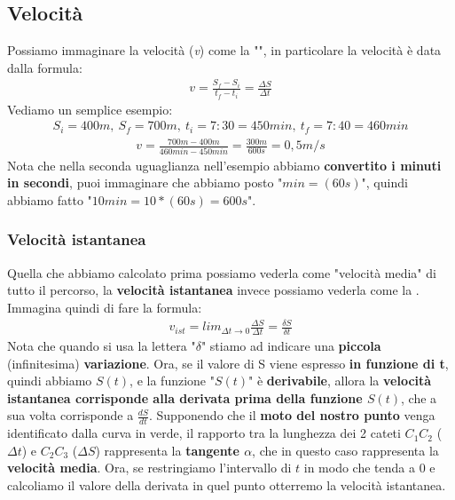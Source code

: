 	\subsection{Velocità}
		Possiamo immaginare la velocità (\textit{v}) come la "", in particolare la velocità è data dalla formula:
		\begin{align*}
			v=\frac{S_f - S_i}{t_f - t_i} = \frac{\Delta S}{\Delta t}
		\end{align*}
		Vediamo un semplice esempio:
		\begin{align*}
			S_i = 400m,\ S_f = 700m,\ t_i = 7:30 = 450 min,\ t_f = 7:40 = 460 min
		\end{align*}
		\begin{align*}
			v=\frac{700m - 400m}{460min - 450min}=\frac{300m}{600s}=0,5m/s
		\end{align*}
		Nota che nella seconda uguaglianza nell'esempio abbiamo \textbf{convertito i minuti in secondi}, puoi immaginare che abbiamo posto "$min = (60s)$", quindi abbiamo fatto "$10 min = 10 * (60s)= 600s$".

		\subsubsection{Velocità istantanea}
			Quella che abbiamo calcolato prima possiamo vederla come "velocità media" di tutto il percorso, la \textbf{velocità istantanea} invece possiamo vederla come la . Immagina quindi di fare la formula:
			\begin{align*}
				v_{ist}=lim_{\Delta t\rightarrow 0} \frac{\Delta S}{\Delta t} = \frac{\delta S}{\delta t}
			\end{align*}
			Nota che quando si usa la lettera "$\delta$" stiamo ad indicare una \textbf{piccola} (infinitesima) \textbf{variazione}. Ora, se il valore di S viene espresso \textbf{in funzione di t}, quindi abbiamo $S(t)$, e la funzione "$S(t)$" è \textbf{derivabile}, allora la \textbf{velocità istantanea corrisponde alla derivata prima della funzione $S(t)$}, che a sua volta corrisponde a $\frac{dS}{dt}$.
			Supponendo che il \textbf{moto del nostro punto} venga identificato dalla curva in verde, il rapporto tra la lunghezza dei 2 cateti $C_1C_2$ ($\Delta t$) e $C_2C_3$ ($\Delta S$) rappresenta la \textbf{tangente $\alpha$}, che in questo caso rappresenta la \textbf{velocità media}. Ora, se restringiamo l'intervallo di $t$ in modo che tenda a 0 e calcoliamo il valore della derivata in quel punto otterremo la velocità istantanea.

